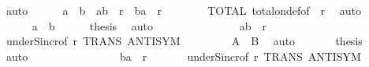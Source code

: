 \begin{isabellebody}
\ auto\isanewline
\ \ \ \ \isamarkupfalse%
\ {\isachardoublequoteopen}a\ {\isacharequal}{\kern0pt}\ b\ {\isasymor}\ {\isacharparenleft}{\kern0pt}a{\isacharcomma}{\kern0pt}b{\isacharparenright}{\kern0pt}\ {\isasymin}\ r\ {\isasymor}\ {\isacharparenleft}{\kern0pt}b{\isacharcomma}{\kern0pt}a{\isacharparenright}{\kern0pt}\ {\isasymin}\ r{\isachardoublequoteclose}\isanewline
\ \ \ \ \isamarkupfalse%
\ {}\ {}\ TOTAL\ total{\isacharunderscore}{\kern0pt}on{\isacharunderscore}{\kern0pt}def{\isacharbrackleft}{\kern0pt}of\ {\isacharunderscore}{\kern0pt}\ r{\isacharbrackright}{\kern0pt}\ \isamarkupfalse%
\ auto\isanewline
\ \ \ \ \isamarkupfalse%
\isanewline
\ \ \ \ \isacommand{{\isacharbraceleft}{\kern0pt}}\isamarkupfalse%
\isamarkupfalse%
\ {\isachardoublequoteopen}a\ {\isacharequal}{\kern0pt}\ b{\isachardoublequoteclose}\ \isamarkupfalse%
\ {}\ {}\ \isamarkupfalse%
\ {\isacharquery}{\kern0pt}thesis\ \isamarkupfalse%
\ auto\isanewline
\ \ \ \ \isacommand{{\isacharbraceright}{\kern0pt}}\isamarkupfalse%
\isanewline
\ \ \ \ \isamarkupfalse%
\isanewline
\ \ \ \ \isacommand{{\isacharbraceleft}{\kern0pt}}\isamarkupfalse%
\isamarkupfalse%
\ {\isachardoublequoteopen}{\isacharparenleft}{\kern0pt}a{\isacharcomma}{\kern0pt}b{\isacharparenright}{\kern0pt}\ {\isasymin}\ r{\isachardoublequoteclose}\isanewline
\ \ \ \ \ \isamarkupfalse%
\ underS{\isacharunderscore}{\kern0pt}incr{\isacharbrackleft}{\kern0pt}of\ r{\isacharbrackright}{\kern0pt}\ TRANS\ ANTISYM\ {}\ {}\isanewline
\ \ \ \ \ \isamarkupfalse%
\ {\isachardoublequoteopen}A\ {\isasymle}\ B{\isachardoublequoteclose}\ \isamarkupfalse%
\ auto\isanewline
\ \ \ \ \ \isamarkupfalse%
\ {\isacharquery}{\kern0pt}thesis\ \isamarkupfalse%
\ auto\isanewline
\ \ \ \ \isacommand{{\isacharbraceright}{\kern0pt}}\isamarkupfalse%
\isanewline
\ \ \ \ \isamarkupfalse%
\isanewline
\ \ \ \ \ \isacommand{{\isacharbraceleft}{\kern0pt}}\isamarkupfalse%
\isamarkupfalse%
\ {\isachardoublequoteopen}{\isacharparenleft}{\kern0pt}b{\isacharcomma}{\kern0pt}a{\isacharparenright}{\kern0pt}\ {\isasymin}\ r{\isachardoublequoteclose}\isanewline
\ \ \ \ \ \isamarkupfalse%
\ underS{\isacharunderscore}{\kern0pt}incr{\isacharbrackleft}{\kern0pt}of\ r{\isacharbrackright}{\kern0pt}\ TRANS\ ANTISYM\ {}\ {}\isanewline

\end{isabellebody}
